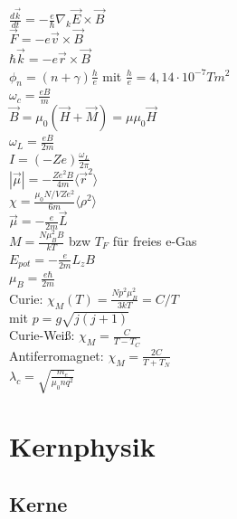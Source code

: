 \documentclass[12pt,a4paper]{article}
\renewcommand{\d}[2]{\frac{d #1}{d #2}}
\renewcommand{\=}[1]{\stackrel{#1}{=}}
\theoremstyle{definition}
\theoremstyle{remark}
\begin{document}
$\d{\vec k}{t} = - \frac{e}{\hbar} \nabla_k \vec E \times \vec B$\\
$\vec F = -e \vec v \times \vec B$\\
$\hbar \vec k = - e \vec r \times \vec B$\\
$\phi_n = (n+\gamma) \frac{h}{e}$ mit $\frac{h}{e} = 4,14 \cdot 10^{-7} Tm^2$\\
$\omega_c = \frac{eB}{m}$\\
$\vec B = \mu_0 (\vec H + \vec M) = \mu \mu_0 \vec H$\\
$\omega_L = \frac{eB}{2m}$\\
$I = (-Ze) \frac{\omega_L}{2\pi}$\\
$|\vec \mu| = -\frac{Ze^2B}{4m} \langle \vec r^2 \rangle$\\
$\chi = \frac{\mu_0 N/V Z e^2}{6m} \langle \rho^2 \rangle$\\
$\vec \mu = - \frac{e}{2m} \vec L$\\
$M = \frac{N \mu_B^2 B}{kT}$ bzw $T_F$ für freies e-Gas\\
$E_{pot} = - \frac{e}{2m} L_z B$\\
$\mu_B = \frac{e\hbar}{2m}$\\
Curie: $\chi_M (T) = \frac{N p^2 \mu_B^2}{3kT} = C/T$\\
mit $p = g \sqrt{j(j+1)}$\\
Curie-Weiß: $\chi_M = \frac{C}{T-T_C}$\\
Antiferromagnet: $\chi_M = \frac{2C}{T+T_N}$\\
$\lambda_c = \sqrt{\frac{m_e}{\mu_0 n q^2}}$

\newpage
\section{Kernphysik}


\subsection{Kerne}

\begin{center}
\begin{minipage}[t]{.35\linewidth}
\vspace{0pt}
\noindent\begin{tabular}{ll}
\toprule

\bottomrule
\end{tabular}
\end{minipage}%
\begin{minipage}[t]{.65\linewidth}
\vspace{0pt}
\begin{tabular}{ll}
\toprule


\end{tabular}
\end{minipage}
\end{center}
\end{document}
